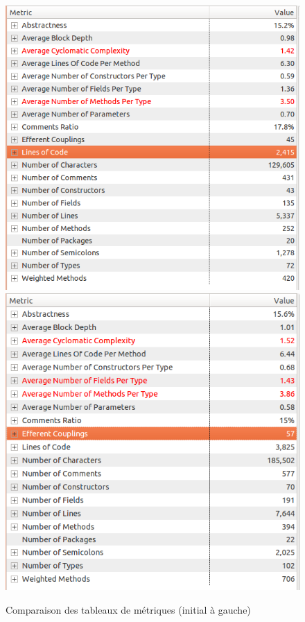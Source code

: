 \documentclass[a4paper,12pt]{report} %
\begin{document}
\begin{figure}[!h]
\includegraphics[scale=0.45]{ressources/final_initial_metrics}\includegraphics[scale=0.45]{ressources/final_new_metrics}\caption{Comparaison des tableaux de métriques (initial à gauche)}


\end{figure}
\end{document}

